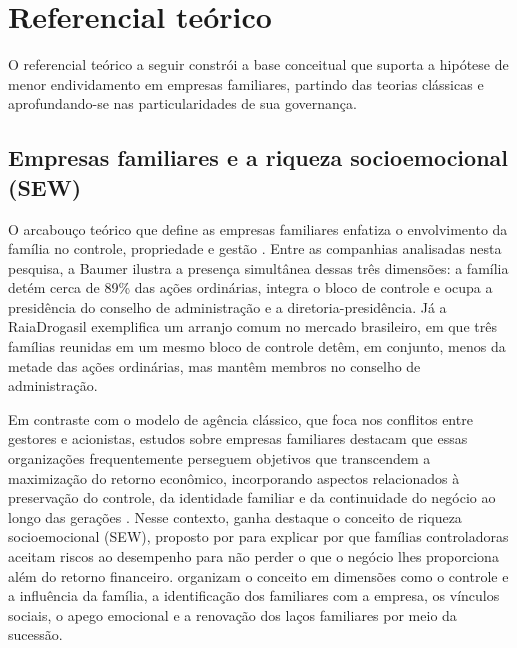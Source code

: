 \chapter{Referencial teórico}\label{cap:referencial}

O referencial teórico a seguir constrói a base conceitual que suporta a hipótese
de menor endividamento em empresas familiares, partindo das teorias clássicas e
aprofundando-se nas particularidades de sua governança.

\section{Empresas familiares e a riqueza socioemocional (SEW)}\label{sec:sew}

O arcabouço teórico que define as empresas familiares enfatiza o envolvimento da
família no controle, propriedade e gestão \cite{santos2018}. Entre as companhias
analisadas nesta pesquisa, a Baumer ilustra a presença simultânea dessas três
dimensões: a família detém cerca de 89\% das ações ordinárias, integra o bloco de
controle e ocupa a presidência do conselho de administração e a
diretoria-presidência. Já a RaiaDrogasil exemplifica um arranjo comum no mercado
brasileiro, em que três famílias reunidas em um mesmo bloco de controle detêm, em
conjunto, menos da metade das ações ordinárias, mas mantêm membros no conselho de
administração.

Em contraste com o modelo de agência clássico, que foca nos conflitos entre
gestores e acionistas, estudos sobre empresas familiares destacam que essas
organizações frequentemente perseguem objetivos que transcendem a maximização do
retorno econômico, incorporando aspectos relacionados à preservação do controle,
da identidade familiar e da continuidade do negócio ao longo das gerações
\cite{ames2020,santos2018}. Nesse contexto, ganha destaque o conceito de riqueza
socioemocional (SEW), proposto por  para explicar por
que famílias controladoras aceitam riscos ao desempenho para não perder o que o
negócio lhes proporciona além do retorno financeiro. 
organizam o conceito em dimensões como o controle e a influência da família, a
identificação dos familiares com a empresa, os vínculos sociais, o apego emocional
e a renovação dos laços familiares por meio da sucessão.


